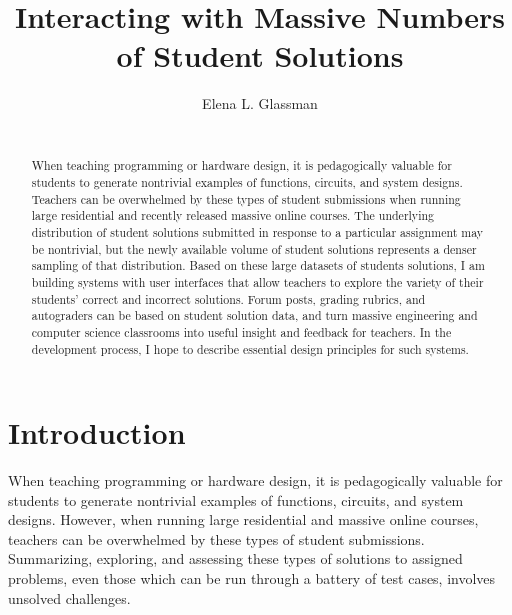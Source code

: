\documentclass{sigchi}
\begin{document}
\title{Interacting with Massive Numbers of Student Solutions}

\author{
\alignauthor Elena L. Glassman \\
 \\
}

\maketitle

\begin{abstract}
When teaching programming or hardware design, it is pedagogically valuable for students to generate nontrivial examples of functions, circuits, and system designs. Teachers can be overwhelmed by these types of student submissions when running large residential and recently released massive online courses. The underlying distribution of student solutions submitted in response to a particular assignment may be nontrivial, but the newly available volume of student solutions represents a denser sampling of that distribution. Based on these large datasets of students solutions, I am building systems with user interfaces that allow teachers to explore the variety of their students’ correct and incorrect solutions. Forum posts, grading rubrics, and autograders can be based on student solution data, and turn massive engineering and computer science classrooms into useful insight and feedback for teachers. In the development process, I hope to describe essential design principles for such systems.
\end{abstract}



\section{Introduction}

When teaching programming or hardware design, it is pedagogically valuable for students to generate nontrivial examples of functions, circuits, and system designs. However, when running large residential and massive online courses, teachers can be overwhelmed by these types of student submissions. Summarizing, exploring, and assessing these types of solutions to assigned problems, even those which can be run through a battery of test cases, involves unsolved challenges.
\end{document}
